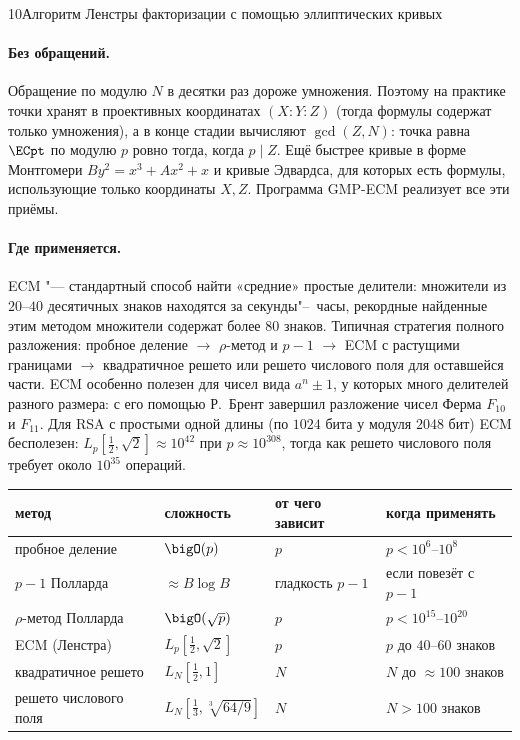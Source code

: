 \begin{lecture}{10}{Алгоритм Ленстры факторизации с помощью эллиптических кривых}
\paragraph{Без обращений.}
Обращение по модулю $N$ в десятки раз дороже умножения. Поэтому на практике точки хранят в
проективных координатах $(X : Y : Z)$ (тогда формулы содержат только умножения), а в конце
стадии вычисляют $\gcd(Z, N)$: точка равна $\ECpt$ по модулю $p$ ровно тогда, когда $p \mid Z$.
Ещё быстрее кривые в форме Монтгомери $By^2 = x^3 + Ax^2 + x$ и кривые Эдвардса, для которых
есть формулы, использующие только координаты $X, Z$. Программа GMP-ECM реализует все эти
приёмы.

\paragraph{Где применяется.}
ECM "--- стандартный способ найти «средние» простые делители: множители из $20$--$40$
десятичных знаков находятся за секунды"--~часы, рекордные найденные этим методом множители
содержат более $80$ знаков. Типичная стратегия полного разложения:
пробное деление $\to$ $\rho$-метод и $p - 1$ $\to$ ECM с растущими границами $\to$ квадратичное
решето или решето числового поля для оставшейся части. ECM особенно полезен для чисел вида
$a^n \pm 1$, у которых много делителей разного размера: с его помощью Р.~Брент завершил
разложение чисел Ферма $F_{10}$ и $F_{11}$. Для RSA с простыми одной длины (по $1024$ бита у
модуля $2048$ бит) ECM бесполезен: $L_p[\frac12, \sqrt 2] \approx 10^{42}$ при $p \approx
10^{308}$, тогда как решето числового поля требует около $10^{35}$ операций.

\begin{center}
\renewcommand{\arraystretch}{1.25}
\begin{tabular}{l|l|l|l}
  метод & сложность & от чего зависит & когда применять \\ \hline
  пробное деление & $\bigO(p)$ & $p$ & $p < 10^{6}$--$10^{8}$ \\
  $p - 1$ Полларда & $\approx B \log B$ & гладкость $p - 1$ & если повезёт с $p - 1$ \\
  $\rho$-метод Полларда & $\bigO(\sqrt p)$ & $p$ & $p < 10^{15}$--$10^{20}$ \\
  ECM (Ленстра) & $L_p[\frac12, \sqrt 2]$ & $p$ & $p$ до $40$--$60$ знаков \\
  квадратичное решето & $L_N[\frac12, 1]$ & $N$ & $N$ до $\approx 100$ знаков \\
  решето числового поля & $L_N[\frac13, \sqrt[3]{64/9}]$ & $N$ & $N > 100$ знаков
\end{tabular}
\end{center}


\end{lecture}
